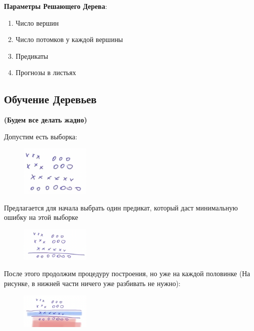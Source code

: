 
        \textbf{Параметры Решающего Дерева}:
        \begin{enumerate}
            \item Число вершин
            \item Число потомков у каждой вершины
            \item Предикаты
            \item Прогнозы в листьях
        \end{enumerate}

        \subsection{Обучение Деревьев}
            \begin{center}
                \textbf{(Будем все делать жадно)}
            \end{center}

            Допустим есть выборка:
            \begin{figure}[H]
                \centering
                \includegraphics[width=0.3\textwidth]{images/8lecture/FitTreeSample1.png}
            \end{figure}
            Предлагается для начала выбрать один предикат, который даст минимальную ошибку на этой выборке
            \begin{figure}[H]
                \centering
                \includegraphics[width=0.3\textwidth]{images/8lecture/FitTreeSample2.png}
            \end{figure}
            После этого продолжим процедуру построения, но уже на каждой половинке (На рисунке, в нижней части ничего уже разбивать не нужно):
            \begin{figure}[H]
                \centering
                \includegraphics[width=0.3\textwidth]{images/8lecture/FitTreeSample3.png}
            \end{figure}

